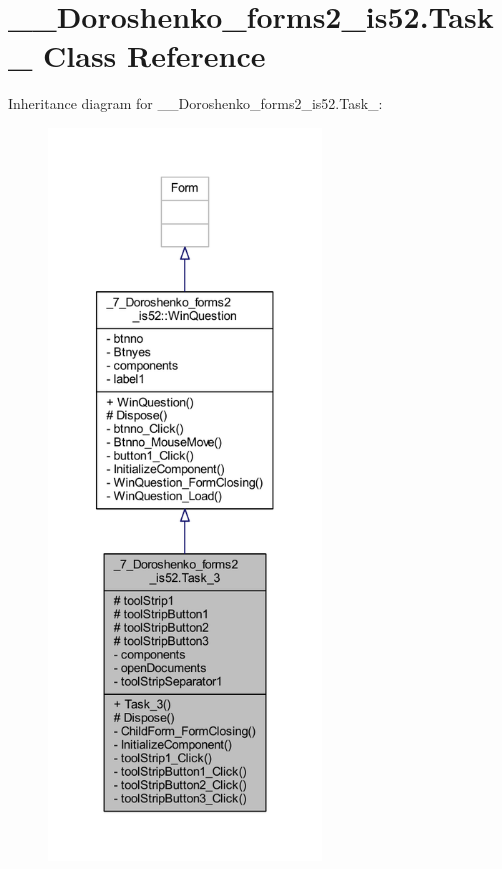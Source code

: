 \hypertarget{class__7___doroshenko__forms2__is52_1_1_task__3}{}\section{\+\_\+\_\+\+Doroshenko\+\_\+forms2\+\_\+is52.\+Task\+\_ Class Reference}
\label{class__7___doroshenko__forms2__is52_1_1_task__3}


Inheritance diagram for \+\_\+\_\+\+Doroshenko\+\_\+forms2\+\_\+is52.\+Task\+\_\+:
\nopagebreak
\begin{figure}[H]
\begin{center}
\leavevmode
\includegraphics[height=550pt]{class__7___doroshenko__forms2__is52_1_1_task__3__inherit__graph}
\end{center}
\end{figure}


